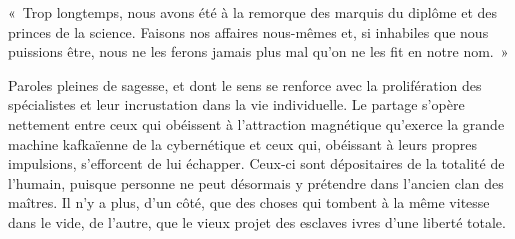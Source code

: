 \documentclass[french,twoside]{book} %
\newenvironment{quoteblock}%
  {\begin{quoting}}
  {\end{quoting}}
\newenvironment{quotebar}{%
    \def\FrameCommand{{\color{rubric!10!}\vrule width 0.5em} \hspace{0.9em}}%
    \def\OuterFrameSep{\itemsep} %
    \MakeFramed {\advance\hsize-\width \FrameRestore}
  }%
  {%
    \endMakeFramed
  }
\renewenvironment{quoteblock}%
  {%
    \savenotes
    \setstretch{0.9}
    \normalfont
    \begin{quotebar}
  }
  {%
    \end{quotebar}
    \spewnotes
  }
\begin{document}
\begin{quoteblock}
\noindent « Trop longtemps, nous avons été à la remorque des marquis du diplôme et des princes de la science. Faisons nos affaires nous-mêmes et, si inhabiles que nous puissions être, nous ne les ferons jamais plus mal qu’on ne les fit en notre nom. »\end{quoteblock}

\noindent Paroles pleines de sagesse, et dont le sens se renforce avec la prolifération des spécialistes et leur incrustation dans la vie individuelle. Le partage s’opère nettement entre ceux qui obéissent à l’attraction magnétique qu’exerce la grande machine kafkaïenne de la cybernétique et ceux qui, obéissant à leurs propres impulsions, s’efforcent de lui échapper. Ceux-ci sont dépositaires de la totalité de l’humain, puisque personne ne peut désormais y prétendre dans l’ancien clan des maîtres. Il n’y a plus, d’un côté, que des choses qui tombent à la même vitesse dans le vide, de l’autre, que le vieux projet des esclaves ivres d’une liberté totale.
\end{document}
